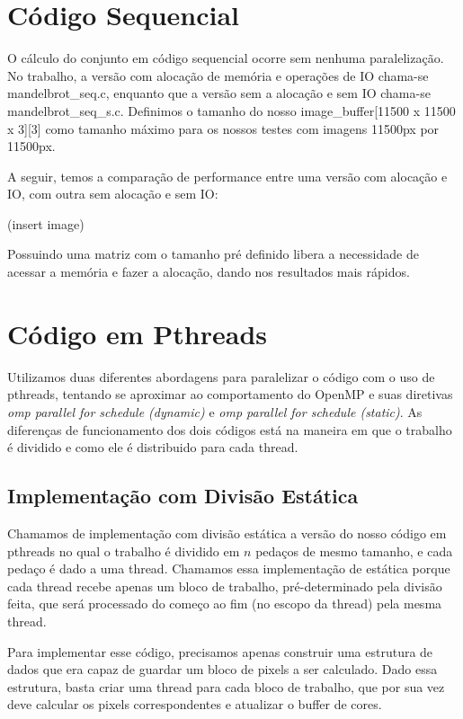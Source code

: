 \documentclass[12pt]{article}
\begin{document}
\newpage
\section{Código Sequencial}
O cálculo do conjunto em código sequencial ocorre sem nenhuma 
paralelização. No trabalho, a versão com alocação de memória e operações
de IO chama-se mandelbrot\_seq.c, enquanto que a versão sem a alocação e
sem IO chama-se mandelbrot\_seq\_s.c. 
Definimos o tamanho do nosso image\_buffer[11500 x 11500 x 3][3] como 
tamanho máximo para os nossos testes com imagens 11500px por 11500px.

A seguir, temos a comparação de performance entre uma versão com 
alocação e IO, com outra sem alocação e sem IO:

(insert image)

Possuindo uma matriz com o tamanho pré definido libera a necessidade de 
acessar a memória e fazer a alocação, dando nos resultados mais rápidos.

\newpage

\section{Código em Pthreads}
Utilizamos duas diferentes abordagens para paralelizar o código com
o uso de pthreads, tentando se aproximar ao comportamento do OpenMP e 
suas diretivas {\em omp parallel for schedule (dynamic)} e {\em omp 
parallel for schedule (static)}. As diferenças de funcionamento dos 
dois códigos está na maneira em que o trabalho é dividido e como ele é
distribuido para cada thread.

\subsection{Implementação com Divisão Estática}
Chamamos de implementação com divisão estática a versão do nosso 
código em pthreads no qual o trabalho é dividido em $n$ pedaços de mesmo 
tamanho, e cada pedaço é dado a uma thread. Chamamos essa implementação
de estática porque cada thread recebe apenas um bloco de trabalho,
pré-determinado pela divisão feita, que será processado do começo ao
fim (no escopo da thread) pela mesma thread.

Para implementar esse código, precisamos apenas construir uma estrutura
de dados que era capaz de guardar um bloco de pixels a ser calculado.
Dado essa estrutura, basta criar uma thread para cada bloco de trabalho,
que por sua vez deve calcular os pixels correspondentes e atualizar o 
buffer de cores.
\end{document}
